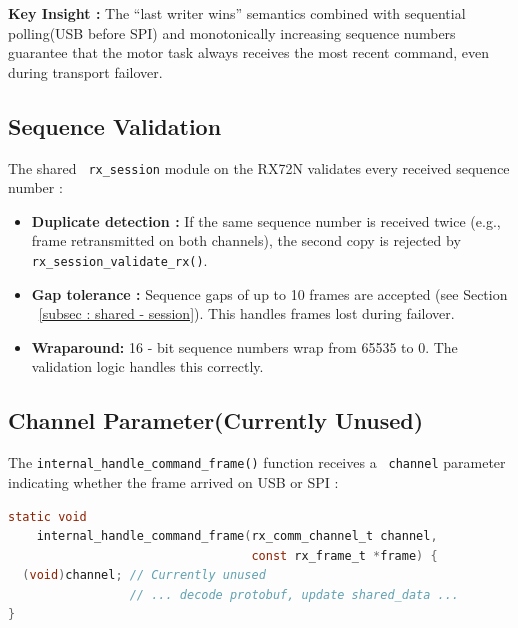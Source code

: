 \noindent\colorbox{keyinsightcolor} {
  \parbox{\dimexpr\linewidth - 2\fboxsep} {
\textbf{Key Insight :
   } The ``last writer wins'' semantics combined with sequential
             polling(USB before SPI) and
        monotonically increasing sequence numbers guarantee that the motor task
            always receives the most recent command,
        even during transport failover.
 }
}

\subsection{Sequence Validation}

The shared \texttt{
    rx\_session} module on the RX72N validates every received sequence number :

\begin{itemize}[leftmargin = 1.5em, topsep = 4pt, itemsep = 2pt]
    \item \textbf{Duplicate detection :} If the same sequence number is received
    twice (e.g., frame retransmitted on both channels),
    the second copy is rejected by \texttt{rx\_session\_validate\_rx()}.
    \item \textbf{Gap tolerance :} Sequence gaps of up to 10 frames are accepted
    (see Section ~\ref{subsec : shared - session}).
    This handles frames lost during failover.
    \item \textbf{Wraparound:
}
16 - bit sequence numbers wrap from 65535 to 0. The validation logic
         handles this correctly.
\end{itemize}

\subsection{Channel Parameter(Currently Unused)}

    The \texttt{internal\_handle\_command\_frame()} function receives a \texttt{
        channel} parameter indicating whether the frame arrived on USB or
    SPI :

\begin{lstlisting}[language = C,
                    caption = {Channel parameter in command handler(
                        internal\_handle\_velocity\_request)}] static void
    internal_handle_command_frame(rx_comm_channel_t channel,
                                  const rx_frame_t *frame) {
  (void)channel; // Currently unused
                 // ... decode protobuf, update shared_data ...
}
\end{lstlisting}

